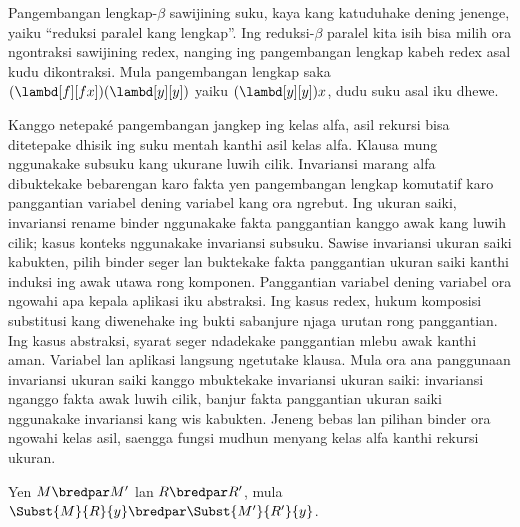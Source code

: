 \documentclass[../../../include/open-logic-section]{subfiles}
\begin{document}
Pangembangan lengkap-$\beta$
sawijining suku, kaya
kang katuduhake dening jenenge,
yaiku ``reduksi paralel kang
lengkap''. Ing reduksi-$\beta$
paralel kita isih bisa milih
ora ngontraksi sawijining redex,
nanging ing pangembangan lengkap
kabeh redex asal kudu dikontraksi.
Mula pangembangan lengkap saka
$(\lambd[f][fx])(\lambd[y][y])$
yaiku $(\lambd[y][y])x$,
dudu suku asal iku dhewe.

\begin{editorial}
  Kanggo netepaké pangembangan jangkep ing kelas alfa, asil rekursi bisa ditetepake dhisik ing suku mentah kanthi asil kelas alfa. Klausa mung nggunakake subsuku kang ukurane luwih cilik. Invariansi marang alfa dibuktekake bebarengan karo fakta yen pangembangan lengkap komutatif karo panggantian variabel dening variabel kang ora ngrebut. Ing ukuran saiki, invariansi rename binder nggunakake fakta panggantian kanggo awak kang luwih cilik; kasus konteks nggunakake invariansi subsuku. Sawise invariansi ukuran saiki kabukten, pilih binder seger lan buktekake fakta panggantian ukuran saiki kanthi induksi ing awak utawa rong komponen. Panggantian variabel dening variabel ora ngowahi apa kepala aplikasi iku abstraksi. Ing kasus redex, hukum komposisi substitusi kang diwenehake ing bukti sabanjure njaga urutan rong panggantian. Ing kasus abstraksi, syarat seger ndadekake panggantian mlebu awak kanthi aman. Variabel lan aplikasi langsung ngetutake klausa. Mula ora ana panggunaan invariansi ukuran saiki kanggo mbuktekake invariansi ukuran saiki: invariansi nganggo fakta awak luwih cilik, banjur fakta panggantian ukuran saiki nggunakake invariansi kang wis kabukten. Jeneng bebas lan pilihan binder ora ngowahi kelas asil, saengga fungsi mudhun menyang kelas alfa kanthi rekursi ukuran.
\end{editorial}

\begin{lem}
  Yen $M \bredpar M'$ lan $R \bredpar R'$,
  mula $\Subst{M}{R}{y}
  \bredpar \Subst{M'}{R'}{y}$.
\end{lem}
\end{document}
